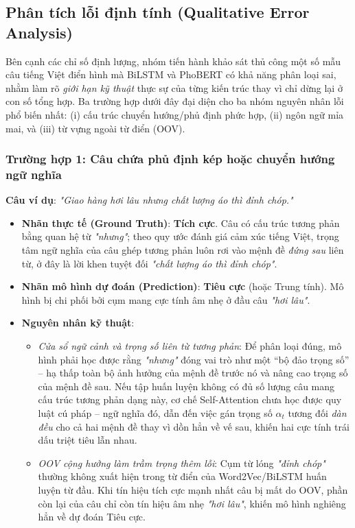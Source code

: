 \documentclass[12pt,a4paper]{article}
\begin{document}
\subsection{Phân tích lỗi định tính (Qualitative Error Analysis)}\label{sec:error_analysis}
Bên cạnh các chỉ số định lượng, nhóm tiến hành khảo sát thủ công một số mẫu câu tiếng Việt điển hình mà BiLSTM và PhoBERT có khả năng phân loại sai, nhằm làm rõ \textit{giới hạn kỹ thuật} thực sự của từng kiến trúc thay vì chỉ dừng lại ở con số tổng hợp. Ba trường hợp dưới đây đại diện cho ba nhóm nguyên nhân lỗi phổ biến nhất: (i) cấu trúc chuyển hướng/phủ định phức hợp, (ii) ngôn ngữ mỉa mai, và (iii) từ vựng ngoài từ điển (OOV).

\subsubsection{Trường hợp 1: Câu chứa phủ định kép hoặc chuyển hướng ngữ nghĩa}\label{sec:error_negation_shift}
\textbf{Câu ví dụ}: \textit{"Giao hàng hơi lâu nhưng chất lượng áo thì đỉnh chóp."}

\begin{itemize}[leftmargin=1.0cm, itemsep=2pt]
    \item[--] \textbf{Nhãn thực tế (Ground Truth)}: \textbf{Tích cực}. Câu có cấu trúc tương phản bằng quan hệ từ \textit{"nhưng"}; theo quy ước đánh giá cảm xúc tiếng Việt, trọng tâm ngữ nghĩa của câu ghép tương phản luôn rơi vào mệnh đề \textit{đứng sau} liên từ, ở đây là lời khen tuyệt đối \textit{"chất lượng áo thì đỉnh chóp"}.
    \item[--] \textbf{Nhãn mô hình dự đoán (Prediction)}: \textbf{Tiêu cực} (hoặc Trung tính). Mô hình bị chi phối bởi cụm mang cực tính âm nhẹ ở đầu câu \textit{"hơi lâu"}.
    \item[--] \textbf{Nguyên nhân kỹ thuật}:
    \begin{itemize}[leftmargin=0.6cm, itemsep=1pt]
        \item \textit{Cửa sổ ngữ cảnh và trọng số liên từ tương phản}: Để phân loại đúng, mô hình phải học được rằng \textit{"nhưng"} đóng vai trò như một ``bộ đảo trọng số'' -- hạ thấp toàn bộ ảnh hưởng của mệnh đề trước nó và nâng cao trọng số của mệnh đề sau. Nếu tập huấn luyện không có đủ số lượng câu mang cấu trúc tương phản dạng này, cơ chế Self-Attention chưa học được quy luật cú pháp -- ngữ nghĩa đó, dẫn đến việc gán trọng số $\alpha_t$ tương đối \textit{dàn đều} cho cả hai mệnh đề thay vì dồn hẳn về vế sau, khiến hai cực tính trái dấu triệt tiêu lẫn nhau.
        \item \textit{OOV cộng hưởng làm trầm trọng thêm lỗi}: Cụm từ lóng \textit{"đỉnh chóp"} thường không xuất hiện trong từ điển của Word2Vec/BiLSTM huấn luyện từ đầu. Khi tín hiệu tích cực mạnh nhất câu bị mất do OOV, phần còn lại của câu chỉ còn tín hiệu âm nhẹ \textit{"hơi lâu"}, khiến mô hình nghiêng hẳn về dự đoán Tiêu cực.
    \end{itemize}
\end{itemize}
\end{document}
